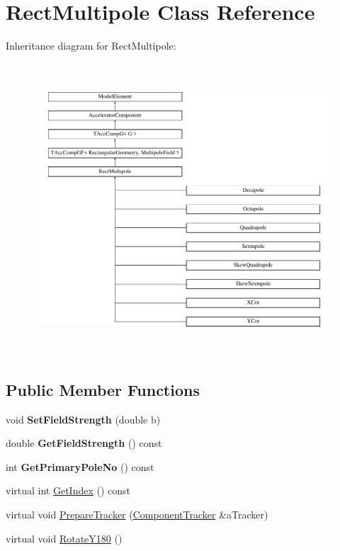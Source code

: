 \hypertarget{classRectMultipole}{}\section{Rect\+Multipole Class Reference}
\label{classRectMultipole}
Inheritance diagram for Rect\+Multipole\+:\begin{figure}[H]
\begin{center}
\leavevmode
\includegraphics[height=10.930931cm]{classRectMultipole}
\end{center}
\end{figure}
\subsection*{Public Member Functions}
\begin{DoxyCompactItemize}
\item 
\mbox{\label{classRectMultipole_abd8a462fd5b1c2884a231aa79b2f0310}} 
void {\bfseries Set\+Field\+Strength} (double b)
\item 
\mbox{\label{classRectMultipole_a31dcf998569d121f8ad9165f8ad39698}} 
double {\bfseries Get\+Field\+Strength} () const
\item 
\mbox{\label{classRectMultipole_a230b498106a348b48ff93141ef0dcf49}} 
int {\bfseries Get\+Primary\+Pole\+No} () const
\item 
virtual int \hyperlink{classRectMultipole_a9bc789b2a193e341aab8bbd47a0e3ad4}{Get\+Index} () const
\item 
virtual void \hyperlink{classRectMultipole_a2626d08254eee03cffb73abb20a9381a}{Prepare\+Tracker} (\hyperlink{classComponentTracker}{Component\+Tracker} \&a\+Tracker)
\item 
virtual void \hyperlink{classRectMultipole_afa249ac1d4f3b6c8c1171e5586731ffd}{Rotate\+Y180} ()
\end{DoxyCompactItemize}
